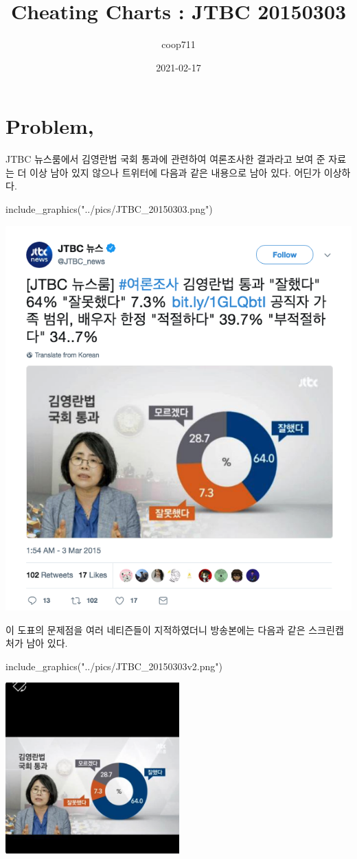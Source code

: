 \documentclass[
]{article}
\title{Cheating Charts : JTBC 20150303}
\author{coop711}
\date{2021-02-17}
\newenvironment{Shaded}{\begin{snugshade}}{\end{snugshade}}
\newcommand{\FunctionTok}[1]{\textcolor[rgb]{0.00,0.00,0.00}{#1}}
\newcommand{\NormalTok}[1]{#1}
\newcommand{\StringTok}[1]{\textcolor[rgb]{0.31,0.60,0.02}{#1}}
\begin{document}
\maketitle

\hypertarget{problem}{%
\section{Problem,}\label{problem}}

JTBC 뉴스룸에서 김영란법 국회 통과에 관련하여 여론조사한 결과라고 보여
준 자료는 더 이상 남아 있지 않으나 트위터에 다음과 같은 내용으로 남아
있다. 어딘가 이상하다.

\begin{Shaded}
\begin{Highlighting}[]
\FunctionTok{include\_graphics}\NormalTok{(}\StringTok{"../pics/JTBC\_20150303.png"}\NormalTok{)}
\end{Highlighting}
\end{Shaded}

\begin{center}\includegraphics[width=0.5\linewidth]{../pics/JTBC_20150303} \end{center}

이 도표의 문제점을 여러 네티즌들이 지적하였더니 방송본에는 다음과 같은
스크린캡처가 남아 있다.

\begin{Shaded}
\begin{Highlighting}[]
\FunctionTok{include\_graphics}\NormalTok{(}\StringTok{"../pics/JTBC\_20150303v2.png"}\NormalTok{)}
\end{Highlighting}
\end{Shaded}

\begin{center}\includegraphics[width=0.45\linewidth]{../pics/JTBC_20150303v2} \end{center}
\end{document}
